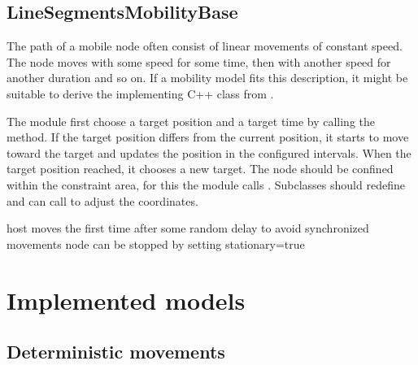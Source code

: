 
\subsection{LineSegmentsMobilityBase}

The path of a mobile node often consist of linear movements of constant
speed. The node moves with some speed for some time, then with another
speed for another duration and so on. If a mobility model fits this
description, it might be suitable to derive the implementing C++ class
from .

The module first choose a target position and a target time by calling
the  method. If the target position differs
from the current position, it starts to move toward the target and
updates the position in the configured  intervals.
When the target position reached, it chooses a new target. The node
should be confined within the constraint area, for this the module calls
. Subclasses should redefine
 and can call  to
adjust the coordinates.

host moves the first time after some random delay to avoid synchronized movements
node can be stopped by setting stationary=true


\section{Implemented models}

\subsection{Deterministic movements}

